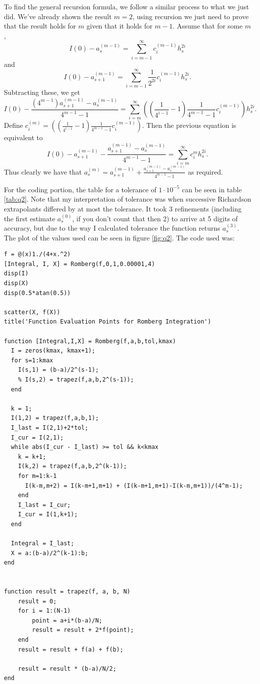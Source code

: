 \documentclass[letterpaper, reqno,11pt]{article}
\begin{document}
To find the general recursion formula, we follow a similar process to what we just did. We've already shown the result $m=2$, using recursion we just need to prove that the result holds for $m$ given that it holds for $m-1$. Assume that for some $m$,
\[
    I(0)-a_{s}^{(m-1)}=\sum_{i=m-1}^{\infty}c_i^{(m-1)}h_s^{2i}
\]
and
\[
    I(0)-a_{s+1}^{(m-1)}=\sum_{i=m-1}^{\infty}\frac{1}{2^{2i}}c_i^{(m-1)}h_{s}^{2i}
.\]
Subtracting these, we get
\[
I(0)-\frac{(4^{m-1})a_{s+1}^{(m-1)}-a_s^{(m-1)}}{4^{m-1}-1}=\sum_{i=m}^{\infty}\left((\frac{1}{4^{i-1}}-1)\frac{1}{4^{m-1}-1}c_i^{(m-1)}\right)h_s^{2i}
.\]
Define $c_i^{(m)}=\left((\frac{1}{4^{i-1}}-1)\frac{1}{4^{m-1}-1}c_i^{(m-1)}\right)$. Then the previous equation is equivalent to
\[
I(0)-a_{s+1}^{(m-1)}-\frac{a_{s+1}^{(m-1)}-a_s^{(m-1)}}{4^{m-1}-1}=\sum_{i=m}^{\infty}c_{i}^{m}h_s^{2i}
.\]
Thus clearly we have that $a_s^{(m)}=a_{s+1}^{(m-1)}+\frac{a_{s+1}^{(m-1)}-a_s^{(m-1)}}{4^{m-1}-1}$ as required.

For the coding portion, the table for a tolerance of $1\cdot 10^{-5}$ can be seen in table \ref{tab:q2}. Note that my interpretation of tolerance was when successive Richardson extrapolants differed by at most the tolerance. It took 3 refinements (including the first estimate $a_s^{(0)}$, if you don't count that then 2) to arrive at 5 digits of accuracy, but due to the way I calculated tolerance the function returns $a_s^{(3)}$. The plot of the values used can be seen in figure \ref{fig:q2}. The code used was:

\begin{lstlisting}
f = @(x)1./(4+x.^2)
[Integral, I, X] = Romberg(f,0,1,0.00001,4)
disp(I)
disp(X)
disp(0.5*atan(0.5))

scatter(X, f(X))
title('Function Evaluation Points for Romberg Integration')

function [Integral,I,X] = Romberg(f,a,b,tol,kmax)
  I = zeros(kmax, kmax+1);
  for s=1:kmax
    I(s,1) = (b-a)/2^(s-1);
    % I(s,2) = trapez(f,a,b,2^(s-1));
  end

  k = 1;
  I(1,2) = trapez(f,a,b,1);
  I_last = I(2,1)+2*tol;
  I_cur = I(2,1);
  while abs(I_cur - I_last) >= tol && k<kmax
    k = k+1;
    I(k,2) = trapez(f,a,b,2^(k-1));
    for m=1:k-1
      I(k-m,m+2) = I(k-m+1,m+1) + (I(k-m+1,m+1)-I(k-m,m+1))/(4^m-1);
    end
    I_last = I_cur;
    I_cur = I(1,k+1);
  end

  Integral = I_last;
  X = a:(b-a)/2^(k-1):b;
end


function result = trapez(f, a, b, N)
    result = 0;
    for i = 1:(N-1)
        point = a+i*(b-a)/N;
        result = result + 2*f(point);
    end
    result = result + f(a) + f(b);

    result = result * (b-a)/N/2;
end

\end{lstlisting}
\end{document}
